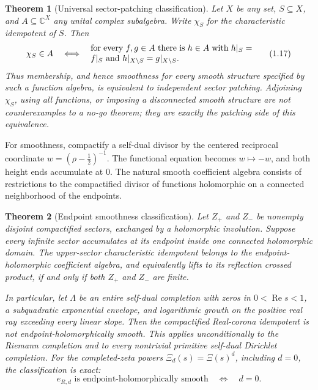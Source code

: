 \documentclass[11pt,reqno]{amsart}
\newtheorem{theorem}{Theorem}[section]
\newcommand{\C}{\mathbb C}
\newcommand{\re}{\operatorname{Re}}
\begin{document}
\begin{theorem}[Universal sector-patching classification]\label{thm:patching}
Let $X$ be any set, $S\subseteq X$, and $A\subseteq\C^X$ any unital complex subalgebra.  Write
$\chi_S$ for the characteristic idempotent of $S$.  Then
\[
 \chi_S\in A
 \quad\Longleftrightarrow\quad
 \begin{minipage}{0.55\linewidth}
 for every $f,g\in A$ there is $h\in A$ with
 $h|_S=f|_S$ and $h|_{X\setminus S}=g|_{X\setminus S}$.
 \end{minipage}                                      \tag{1.17}
\]
Thus membership, and hence smoothness for every smooth structure specified by such a function
algebra, is equivalent to independent sector patching.  Adjoining $\chi_S$, using all functions,
or imposing a disconnected smooth structure are not counterexamples to a no-go theorem; they
are exactly the patching side of this equivalence.
\end{theorem}

For smoothness, compactify a self-dual divisor by the centered reciprocal coordinate
$w=(\rho-\tfrac12)^{-1}$.  The functional equation becomes $w\mapsto-w$, and both height ends
accumulate at $0$.  The natural smooth coefficient algebra consists of restrictions to the
compactified divisor of functions holomorphic on a connected neighborhood of the endpoints.

\begin{theorem}[Endpoint smoothness classification]\label{thm:p3}
Let $Z_+$ and $Z_-$ be nonempty disjoint compactified sectors, exchanged by a holomorphic
involution.  Suppose every infinite sector accumulates at its endpoint inside one connected
holomorphic domain.  The upper-sector characteristic idempotent belongs to the endpoint-
holomorphic coefficient algebra, and equivalently lifts to its reflection crossed product, if and
only if both $Z_+$ and $Z_-$ are finite.

In particular, let $\Lambda$ be an entire self-dual completion with zeros in $0<\re s<1$, a
subquadratic exponential envelope, and logarithmic growth on the positive real ray exceeding every
linear slope.  Then the compactified Real-corona idempotent is not endpoint-holomorphically smooth.
This applies unconditionally to the Riemann completion and to every nontrivial primitive self-dual
Dirichlet completion.  For the completed-zeta powers $\Xi_d(s)=\Xi(s)^d$, including $d=0$, the
classification is exact:
\[
 e_{R,d}\text{ is endpoint-holomorphically smooth}
       \quad\Longleftrightarrow\quad d=0.             \tag{1.18}
\]
\end{theorem}
\end{document}
